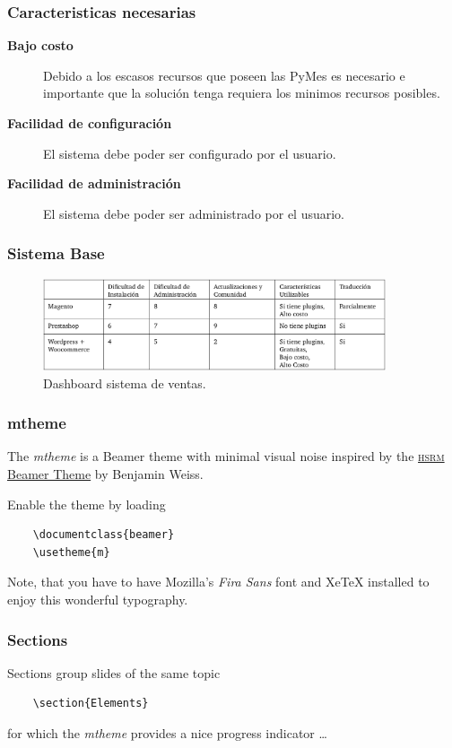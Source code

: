 \documentclass[10pt, compress]{beamer}
\begin{document}
\begin{frame}
 \frametitle{Caracteristicas necesarias}
\begin{description}
 \item[\textbf{Bajo costo}] Debido a los escasos recursos que poseen las PyMes es necesario e importante que
la solución tenga requiera los minimos recursos posibles.
 \item[\textbf{Facilidad de configuración}] El sistema debe poder ser configurado por el usuario.
 \item[\textbf{Facilidad de administración}] El sistema debe poder ser administrado por el usuario.
\end{description}
\end{frame}

\begin{frame}
 \frametitle{Sistema Base}

\begin{figure}
\centering
    \includegraphics[width=0.9\textwidth]{images/tablaWord.png}
    \caption{Dashboard sistema de ventas.}
    \label{fig:awesome_image}
\end{figure}

\end{frame}

\begin{frame}[fragile]
  \frametitle{mtheme}

  The \emph{mtheme} is a Beamer theme with minimal visual noise inspired by the
  \href{https://github.com/hsrmbeamertheme/hsrmbeamertheme}{\textsc{hsrm} Beamer
  Theme} by Benjamin Weiss.

  Enable the theme by loading

  \begin{verbatim}
    \documentclass{beamer}
    \usetheme{m}
  \end{verbatim}

  Note, that you have to have Mozilla's \emph{Fira Sans} font and XeTeX
  installed to enjoy this wonderful typography.
\end{frame}

\begin{frame}[fragile]
  \frametitle{Sections}
  Sections group slides of the same topic

  \begin{verbatim}
    \section{Elements}
  \end{verbatim}

  for which the \emph{mtheme} provides a nice progress indicator \ldots
\end{frame}
\end{document}
